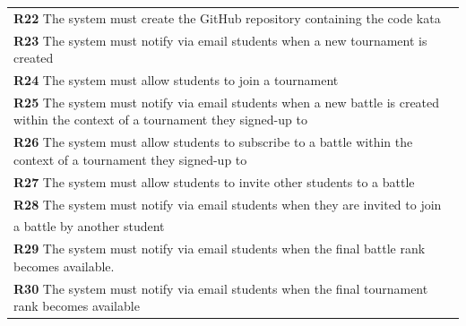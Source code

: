 \begin{table}[H]
\begin{tabularx}{\textwidth}{X}
        \textbf{R22} The system must create the GitHub repository containing the code kata               \\ 
        \textbf{R23} The system must notify via email students when a new tournament is created            \\ 
        \textbf{R24} The system must allow students to join a tournament     \\ 
        \textbf{R25} The system must notify via email students when a new battle is created within the context of a tournament they signed-up to        \\ 
        \textbf{R26} The system must allow students to subscribe to a battle  within the context of a tournament they signed-up to            \\
        \textbf{R27} The system must allow students to invite other students to a battle     \\ 
        \textbf{R28} The system must notify via email students when they are invited to join \\ a battle by another student        \\ 
        \textbf{R29} The system must notify via email students when the final battle rank becomes available.       \\ 
        \textbf{R30} The system must notify via email students when the final tournament rank becomes available     \\ 
        
    \end{tabularx}
\end{table}

